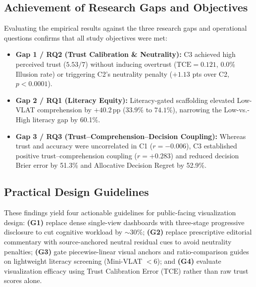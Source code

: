 \documentclass[conference]{IEEEtran}
\newcommand{\TCE}{\mathrm{TCE}}
\begin{document}
\subsection{Achievement of Research Gaps and Objectives}
Evaluating the empirical results against the three research gaps and operational questions confirms that all study objectives were met:
\begin{itemize}
\item \textbf{Gap 1 / RQ2 (Trust Calibration \& Neutrality):} C3 achieved high perceived trust ($5.53/7$) without inducing overtrust ($\TCE = 0.121$, 0.0\% Illusion rate) or triggering C2's neutrality penalty ($+1.13$ pts over C2, $p < 0.0001$).
\item \textbf{Gap 2 / RQ1 (Literacy Equity):} Literacy-gated scaffolding elevated Low-VLAT comprehension by $+40.2$\,pp ($33.9\%$ to $74.1\%$), narrowing the Low-vs.-High literacy gap by 60.1\%.
\item \textbf{Gap 3 / RQ3 (Trust--Comprehension--Decision Coupling):} Whereas trust and accuracy were uncorrelated in C1 ($r = -0.006$), C3 established positive trust--comprehension coupling ($r = +0.283$) and reduced decision Brier error by 51.3\% and Allocative Decision Regret by 52.9\%.
\end{itemize}

\subsection{Practical Design Guidelines}
These findings yield four actionable guidelines for public-facing visualization design: \textbf{(G1)} replace dense single-view dashboards with three-stage progressive disclosure to cut cognitive workload by $\sim$30\%; \textbf{(G2)} replace prescriptive editorial commentary with source-anchored neutral residual cues to avoid neutrality penalties; \textbf{(G3)} gate piecewise-linear visual anchors and ratio-comparison guides on lightweight literacy screening (Mini-VLAT $< 6$); and \textbf{(G4)} evaluate visualization efficacy using Trust Calibration Error ($\TCE$) rather than raw trust scores alone.
\end{document}
